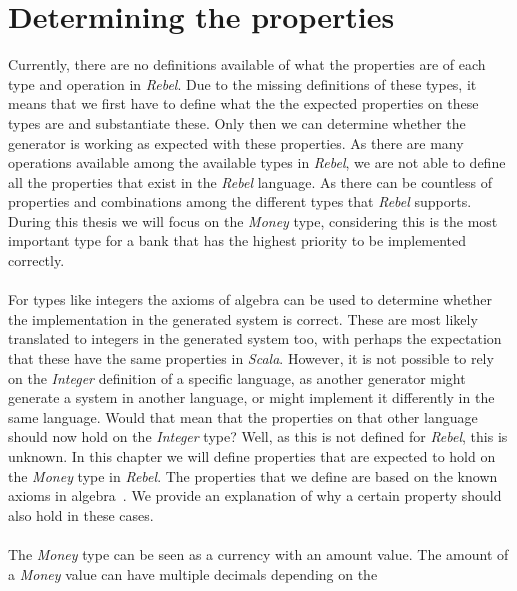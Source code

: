 \section{Determining the properties}
Currently, there are no definitions available of what the properties are of each
type and operation in \textit{Rebel}. Due to the missing definitions of these
types, it means that we first have to define what the the expected properties
on these types are and substantiate these. Only then we can determine whether
the generator is working as expected with these properties. As there are many
operations available among the available types in \textit{Rebel}, we are not
able to define all the properties that exist in the \textit{Rebel} language. As
there can be countless of properties and combinations among the different types
that \textit{Rebel} supports. During this thesis we will focus on the
\textit{Money} type, considering this is the most important type for a bank that
has the highest priority to be implemented correctly.\\
\\
For types like integers the axioms of algebra can be used to determine whether
the implementation in the generated system is correct. These are most likely
translated to integers in the generated system too, with perhaps the expectation
that these have the same properties in \textit{Scala}. However, it is not
possible to rely on the \textit{Integer} definition of a specific language, as
another generator might generate a system in another language, or might
implement it differently in the same language. Would that mean that the
properties on that other language should now hold on the \textit{Integer} type?
Well, as this is not defined for \textit{Rebel}, this is unknown. In this
chapter we will define properties that are expected to hold on the
\textit{Money} type in \textit{Rebel}. The properties that we define are based
on the known axioms in
algebra~\cite{baumgart1961axioms,raftery2011perspective,apostol2007calculus}.
We provide an explanation of why a certain property should also hold in these
cases.\\
\\
The \textit{Money} type can be seen as a currency with an amount value. The
amount of a \textit{Money} value can have multiple decimals depending on the
